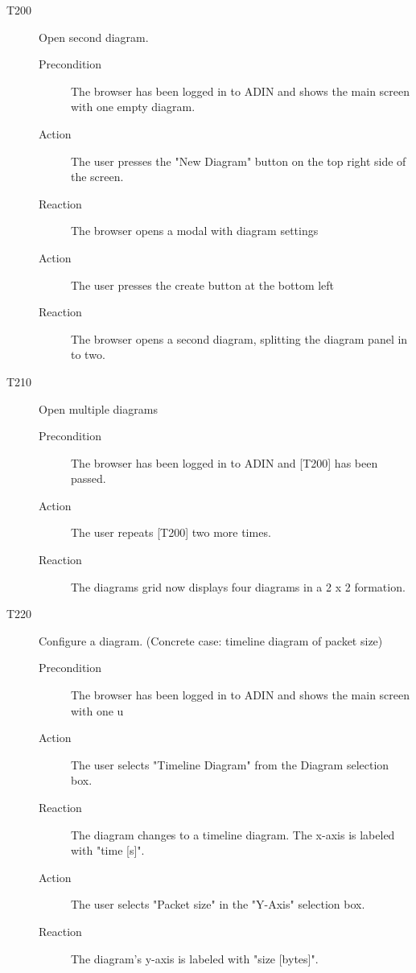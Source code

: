\documentclass[twoside, english, draft]{Pflichtenheft}
\begin{document}
\begin{description}
	\item[T200] Open second diagram.
	      \begin{description}
		      \item[Precondition]
		            The browser has been logged in to ADIN and shows the main screen with one empty diagram.
		      \item[Action]
		            The user presses the "New Diagram" button on the top right side of the screen.
		      \item[Reaction]
		            The browser opens a modal with diagram settings
		      \item[Action]
		            The user presses the create button at the bottom left
		      \item[Reaction]
		            The browser opens a second diagram, splitting the diagram panel in to two.
	      \end{description}



	\item[T210] Open multiple diagrams
	      \begin{description}
		      \item[Precondition]
		            The browser has been logged in to ADIN and [T200] has been passed.
		      \item[Action]
		            The user repeats [T200] two more times.
		      \item[Reaction]
		            The diagrams grid now displays four diagrams in a 2 x 2 formation.
	      \end{description}

	\item[T220] Configure a diagram. (Concrete case: timeline diagram of packet size)
	      \begin{description}
		      \item[Precondition]
		            The browser has been logged in to ADIN and shows the main screen with one u
		      \item[Action]
		            The user selects "Timeline Diagram" from the Diagram selection box.
		      \item[Reaction]
		            The diagram changes to a timeline diagram. The x-axis is labeled with "time [s]".
		      \item[Action]
		            The user selects "Packet size" in the "Y-Axis" selection box.
		      \item[Reaction]
		            The diagram's y-axis is labeled with "size [bytes]".
	      \end{description}


\end{description}
\end{document}
